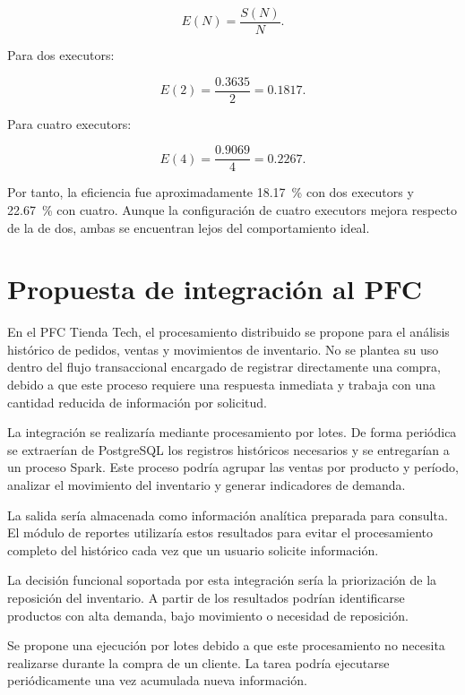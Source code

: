 \documentclass[12pt,a4paper]{article}
\begin{document}
\begin{equation}
E(N)=\frac{S(N)}{N}.
\label{eq:eficiencia}
\end{equation}

Para dos executors:

\[
E(2)=
\frac{0.3635}{2}
=
0.1817.
\]

Para cuatro executors:

\[
E(4)=
\frac{0.9069}{4}
=
0.2267.
\]

Por tanto, la eficiencia fue aproximadamente
\SI{18.17}{\percent} con dos executors y
\SI{22.67}{\percent} con cuatro. Aunque la configuración de cuatro executors
mejora respecto de la de dos, ambas se encuentran lejos del comportamiento
ideal.

\section{Propuesta de integración al PFC}

En el PFC Tienda Tech, el procesamiento distribuido se propone para el análisis
histórico de pedidos, ventas y movimientos de inventario. No se plantea su uso
dentro del flujo transaccional encargado de registrar directamente una compra,
debido a que este proceso requiere una respuesta inmediata y trabaja con una
cantidad reducida de información por solicitud.

La integración se realizaría mediante procesamiento por lotes. De forma
periódica se extraerían de PostgreSQL los registros históricos necesarios y se
entregarían a un proceso Spark. Este proceso podría agrupar las ventas por
producto y período, analizar el movimiento del inventario y generar indicadores
de demanda.

La salida sería almacenada como información analítica preparada para consulta.
El módulo de reportes utilizaría estos resultados para evitar el procesamiento
completo del histórico cada vez que un usuario solicite información.

La decisión funcional soportada por esta integración sería la priorización de
la reposición del inventario. A partir de los resultados podrían identificarse
productos con alta demanda, bajo movimiento o necesidad de reposición.

Se propone una ejecución por lotes debido a que este procesamiento no necesita
realizarse durante la compra de un cliente. La tarea podría ejecutarse
periódicamente una vez acumulada nueva información.
\end{document}

